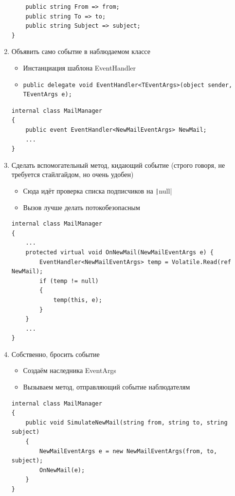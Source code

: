 \documentclass{../../text-style}
\begin{document}
\begin{enumerate}
\begin{verbatim}
    public string From => from;
    public string To => to;
    public string Subject => subject;
}
        \end{verbatim}
    \item Объявить само событие в наблюдаемом классе
        \begin{itemize}
            \item Инстанциация шаблона EventHandler
            \item 
                \begin{verbatim}
public delegate void EventHandler<TEventArgs>(object sender, TEventArgs e);
                \end{verbatim}
        \end{itemize}
        \begin{verbatim}
internal class MailManager 
{
    public event EventHandler<NewMailEventArgs> NewMail;
    ...
}
        \end{verbatim}
    \item Сделать вспомогательный метод, кидающий событие (строго говоря, не требуется стайлгайдом, но очень удобен)
        \begin{itemize}
            \item Сюда идёт проверка списка подписчиков на \texttt|null|
            \item Вызов лучше делать потокобезопасным
        \end{itemize}
        \begin{verbatim}
internal class MailManager 
{
    ...
    protected virtual void OnNewMail(NewMailEventArgs e) {
        EventHandler<NewMailEventArgs> temp = Volatile.Read(ref NewMail);
        if (temp != null) 
        {
            temp(this, e);
        }
    }
    ...
}
        \end{verbatim}
    \item Собственно, бросить событие
        \begin{itemize}
            \item Создаём наследника EventArgs
            \item Вызываем метод, отправляющий событие наблюдателям
        \end{itemize}
        \begin{verbatim}
internal class MailManager 
{
    public void SimulateNewMail(string from, string to, string subject) 
    {
        NewMailEventArgs e = new NewMailEventArgs(from, to, subject);
        OnNewMail(e);
    }
}
        \end{verbatim}
\end{enumerate}
\end{document}
